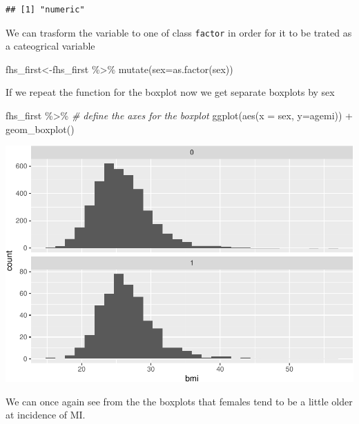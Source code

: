 \documentclass[
]{book}
\newenvironment{Shaded}{\begin{snugshade}}{\end{snugshade}}
\newcommand{\AttributeTok}[1]{\textcolor[rgb]{0.77,0.63,0.00}{#1}}
\newcommand{\CommentTok}[1]{\textcolor[rgb]{0.56,0.35,0.01}{\textit{#1}}}
\newcommand{\FunctionTok}[1]{\textcolor[rgb]{0.00,0.00,0.00}{#1}}
\newcommand{\NormalTok}[1]{#1}
\newcommand{\OtherTok}[1]{\textcolor[rgb]{0.56,0.35,0.01}{#1}}
\newcommand{\SpecialCharTok}[1]{\textcolor[rgb]{0.00,0.00,0.00}{#1}}
\begin{document}
\begin{verbatim}
## [1] "numeric"
\end{verbatim}

We can trasform the variable to one of class \texttt{factor} in order for it to be trated as a cateogrical variable

\begin{Shaded}
\begin{Highlighting}[]
\NormalTok{fhs\_first}\OtherTok{\textless{}{-}}\NormalTok{fhs\_first }\SpecialCharTok{\%\textgreater{}\%} 
\FunctionTok{mutate}\NormalTok{(}\AttributeTok{sex=}\FunctionTok{as.factor}\NormalTok{(sex))}
\end{Highlighting}
\end{Shaded}

If we repeat the function for the boxplot now we get separate boxplots by sex

\begin{Shaded}
\begin{Highlighting}[]
\NormalTok{fhs\_first }\SpecialCharTok{\%\textgreater{}\%} 
  \CommentTok{\# define the axes for the boxplot}
  \FunctionTok{ggplot}\NormalTok{(}\FunctionTok{aes}\NormalTok{(}\AttributeTok{x =}\NormalTok{ sex, }\AttributeTok{y=}\NormalTok{agemi)) }\SpecialCharTok{+} 
  \FunctionTok{geom\_boxplot}\NormalTok{()}
\end{Highlighting}
\end{Shaded}

\includegraphics{adv_epi_analysis_files/figure-latex/unnamed-chunk-192-1.pdf}

We can once again see from the the boxplots that females tend to be a little older at incidence of MI.
\end{document}
